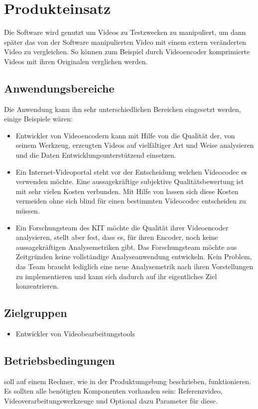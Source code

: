 \chapter{Produkteinsatz}
Die Software wird genutzt um Videos zu Testzwecken zu manipuliert, um dann später das von der Software manipulierten Video mit einem extern veränderten Video zu vergleichen. So können zum Beispiel durch Videoencoder komprimierte Videos mit ihren Originalen verglichen werden.
\section{Anwendungsbereiche}
Die Anwendung kann ihn sehr unterschiedlichen Bereichen eingesetzt werden, einige Beispiele wären:
\begin{itemize}
\item Entwickler von Videoencodern kann mit Hilfe von \projektTitel die Qualität der, von seinem
		Werkzeug, erzeugten Videos auf vielfältiger Art und Weise analysieren und die Daten
		Entwicklungsunterstützend einsetzen.
\item Ein Internet-Videoportal steht vor der Entscheidung welchen Videocodec es verwenden möchte.
		Eine aussagekräftige subjektive Qualitätsbewertung ist mit sehr vielen Kosten verbunden.
		Mit Hilfe von \projektTitel lassen sich diese Kosten vermeiden ohne sich blind für
		einen bestimmten Videocodec entscheiden zu müssen.
\item Ein Forschungsteam des \gls{KIT} möchte die Qualität ihrer Videoencoder analysieren, stellt
		aber fest, dass es, für ihren Encoder, noch keine aussagekräftigen Analysemetriken gibt.
		Das Forschungsteam möchte aus Zeitgründen keine vollständige Analyseanwendung entwickeln.
		Kein Problem, das Team braucht lediglich \projektTitel eine neue Analysemetrik nach ihren
		Vorstellungen zu implementieren und kann sich dadurch auf ihr eigentliches Ziel konzentrieren. 
\end{itemize}
\section{Zielgruppen}
\begin{itemize}

\item Entwickler von Videobearbeitungstools

\end{itemize}
\section{Betriebsbedingungen}
\projektTitel soll auf einem Rechner, wie in der Produktumgebung beschrieben, funktionieren.
Es sollten alle benötigten Komponenten vorhanden sein:
Referenzvideo, Videoverarbeitungswerkzeuge und Optional dazu Parameter für diese.